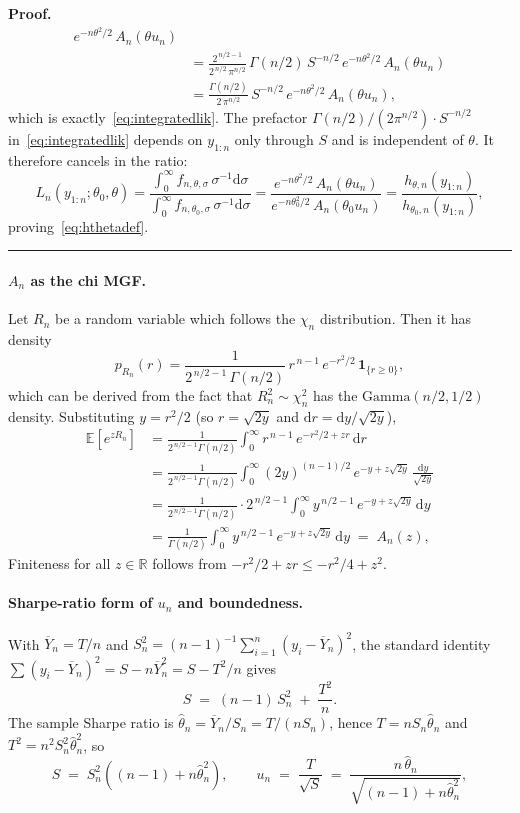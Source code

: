 \documentclass{article}%
\newenvironment{proof}[1][Proof]{\noindent\textbf{#1.} }{\ \rule{0.5em}{0.5em}}
\newcommand{\E}{\mathbb{E}}
\newcommand{\diff}{\mathrm{d}}
\newcommand{\1}{\mathbf{1}}
\begin{document}
\begin{proof}
\begin{align*}
   e^{-n\theta^{2}/2}\,A_n(\theta u_n)\\
&= \frac{2^{\,n/2-1}}{2^{\,n/2}\,\pi^{n/2}}\,\Gamma(n/2)\,S^{-n/2}\,
   e^{-n\theta^{2}/2}\,A_n(\theta u_n)\\
&= \frac{\Gamma(n/2)}{2\,\pi^{n/2}}\,S^{-n/2}\,
   e^{-n\theta^{2}/2}\,A_n(\theta u_n),
\end{align*}
which is exactly~\eqref{eq:integratedlik}. The prefactor $\Gamma(n/2)/(2\pi^{n/2})\cdot S^{-n/2}$
in~\eqref{eq:integratedlik} depends on $y_{1:n}$ only through $S$ and is independent of $\theta$. It therefore cancels in the ratio:
\[
L_n(y_{1:n};\theta_0,\theta)
=\frac{\int_{0}^{\infty}\! f_{n,\theta,\sigma}\,\sigma^{-1}\diff\sigma}
      {\int_{0}^{\infty}\! f_{n,\theta_0,\sigma}\,\sigma^{-1}\diff\sigma}
=\frac{e^{-n\theta^{2}/2}\,A_n(\theta u_n)}
      {e^{-n\theta_0^{2}/2}\,A_n(\theta_0 u_n)}
=\frac{h_{\theta,n}(y_{1:n})}{h_{\theta_0,n}(y_{1:n})},
\]
proving~\eqref{eq:hthetadef}. 
\end{proof}

\paragraph{$A_n$ as the chi MGF.} Let $R_n$ be a random variable which follows the $\chi_n$ distribution. Then it has density
\[
p_{R_n}(r)
=\frac{1}{2^{\,n/2-1}\,\Gamma(n/2)}\,
  r^{\,n-1}\,e^{-r^{2}/2}\,\1_{\{r\geq 0\}},
\]
which can be derived from the fact that $R_n^{2}\sim\chi^{2}_n$ has the $\mathrm{Gamma}(n/2,1/2)$ density. Substituting
$y=r^{2}/2$ (so $r=\sqrt{2y}$ and $\diff r=\diff y/\sqrt{2y}$),
\allowdisplaybreaks
\begin{align*}
\E\!\left[e^{zR_n}\right]
&=\frac{1}{2^{\,n/2-1}\Gamma(n/2)}
  \int_{0}^{\infty}\! r^{\,n-1}\,e^{-r^{2}/2 + zr}\,\diff r\\
&=\frac{1}{2^{\,n/2-1}\Gamma(n/2)}
  \int_{0}^{\infty}\! (2y)^{(n-1)/2}\,e^{-y+z\sqrt{2y}}\,\frac{\diff y}{\sqrt{2y}}\\
&=\frac{1}{2^{\,n/2-1}\Gamma(n/2)}\cdot 2^{\,n/2-1}
  \int_{0}^{\infty}\! y^{\,n/2-1}\,e^{-y+z\sqrt{2y}}\,\diff y\\
&=\frac{1}{\Gamma(n/2)}
  \int_{0}^{\infty}\! y^{\,n/2-1}\,e^{-y+z\sqrt{2y}}\,\diff y
  \;=\; A_n(z),
\end{align*}
Finiteness for all $z\in\mathbb{R}$ follows from $-r^{2}/2+zr\leq -r^{2}/4+z^{2}$.

\paragraph{Sharpe-ratio form of $u_n$ and boundedness.} With $\overline{Y}_n=T/n$ and
$S_n^{2}=(n-1)^{-1}\sum_{i=1}^{n}(y_i-\overline{Y}_n)^{2}$, the standard
identity $\sum(y_i-\overline{Y}_n)^{2}=S-n\overline{Y}_n^{2}=S-T^{2}/n$
gives
\[
S \;=\; (n-1)\,S_n^{2} \;+\; \frac{T^{2}}{n}.
\]
The sample Sharpe ratio is
$\widehat{\theta}_n=\overline{Y}_n/S_n=T/(nS_n)$, hence
$T=nS_n\widehat{\theta}_n$ and $T^{2}=n^{2}S_n^{2}\widehat{\theta}_n^{2}$, so
\[
S \;=\; S_n^{2}\!\left((n-1)+n\widehat{\theta}_n^{2}\right),
\qquad
u_n \;=\; \frac{T}{\sqrt{S}}
\;=\; \frac{n\,\widehat{\theta}_n}{\sqrt{(n-1)+n\widehat{\theta}_n^{2}}},
\]
\end{document}
